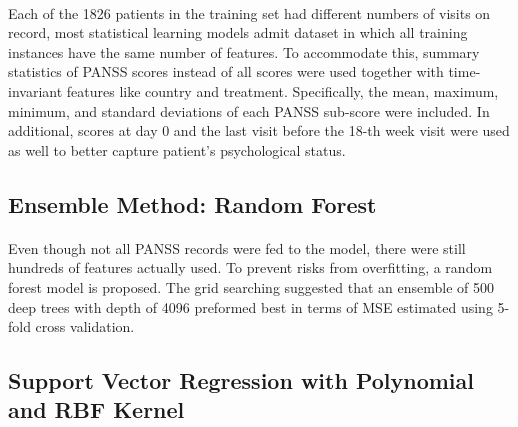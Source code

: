 \documentclass[11pt]{article}
\begin{document}
	\paragraph{} Each of the 1826 patients in the training set had different numbers of visits on record, most statistical learning models admit dataset in which all training instances have the same number of features. To accommodate this, summary statistics of PANSS scores instead of all scores were used together with time-invariant features like country and treatment. Specifically, the mean, maximum, minimum, and standard deviations of each PANSS sub-score were included. In additional, scores at day 0 and the last visit before the 18-th week visit were used as well to better capture patient's psychological status.

	\subsection{Ensemble Method: Random Forest}
	\paragraph{} Even though not all PANSS records were fed to the model, there were still hundreds of features actually used. To prevent risks from overfitting, a random forest model is proposed. The grid searching suggested that an ensemble of 500 deep trees with depth of 4096 preformed best in terms of MSE estimated using 5-fold cross validation.

	\subsection{Support Vector Regression with Polynomial and RBF Kernel}
\end{document}
